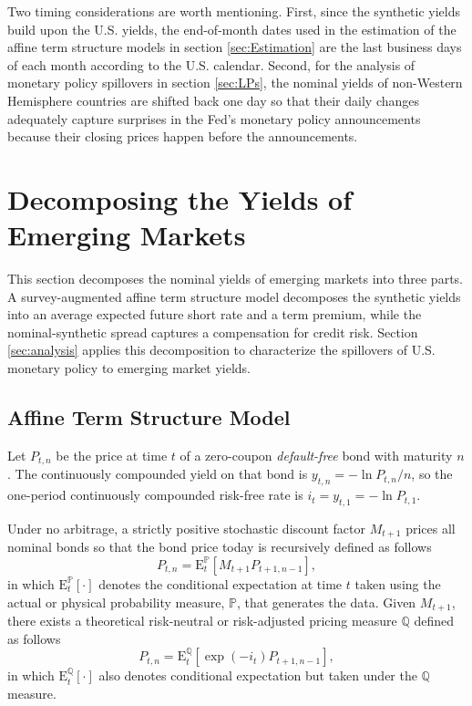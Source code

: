 \documentclass[a4paper, 12pt]{article}
\providecommand{\tnr}{n}
\providecommand{\idxt}{t}
\providecommand{\idxs}{\idxt,\tnr}
\providecommand{\yld}{y}
\providecommand{\yZero}{\yld_{\idxs}}
\providecommand{\Pzero}{P_{\idxs}}
\providecommand{\Pzerolag}{P_{\idxt+1,\tnr-1}}
\providecommand{\srate}{i}
\providecommand{\shortrate}{\srate_{\idxt}}
\providecommand{\SDF}{M_{\idxt+1}}
\providecommand{\Pmeasure}{\mathbb{P}}
\providecommand{\Qmeasure}{\mathbb{Q}}
\providecommand{\ExpP}{\mathrm{E}^{\Pmeasure}_{t}}
\providecommand{\ExpQ}{\mathrm{E}^{\Qmeasure}_{t}}
\newcommand{\PzeroP}{\Pzero = \ExpP \left[ \SDF \Pzerolag \right]}
\newcommand{\PzeroQ}{\Pzero = \ExpQ \left[ \exp\left(- \shortrate\right) \Pzerolag \right]}
\begin{document}
Two timing considerations are worth mentioning. First, since the synthetic yields build upon the U.S. yields, the end-of-month dates used in the estimation of the affine term structure models in section \ref{sec:Estimation} are the last business days of each month according to the U.S. calendar. Second, for the analysis of monetary policy spillovers in section \ref{sec:LPs}, the nominal yields of non-Western Hemisphere countries are shifted back one day so that their daily changes adequately capture surprises in the Fed's monetary policy announcements because their closing prices happen before the announcements. 


\section{Decomposing the Yields of Emerging Markets} \label{sec:Decomposition}
This section decomposes the nominal yields of emerging markets into three parts. A survey-augmented affine term structure model decomposes the synthetic yields into an average expected future short rate and a term premium, while the nominal-synthetic spread captures a compensation for credit risk. Section \ref{sec:analysis} applies this decomposition to characterize the spillovers of U.S. monetary policy to emerging market yields. 

\subsection{Affine Term Structure Model} \label{sec:YCmodel}
Let \(\Pzero\) be the price at time \(\idxt\) of a zero-coupon \textit{default-free} bond with maturity \(\tnr\). The continuously compounded yield on that bond is \(\yZero = - \ln \Pzero/\tnr\), so the one-period continuously compounded risk-free rate is \(\shortrate = \yld_{\idxt,1} = - \ln P_{t,1}\).

Under no arbitrage, a strictly positive stochastic discount factor \(\SDF\) prices all nominal bonds so that the bond price today is recursively defined as follows
\begin{equation} \label{eq:nPzeroP}
\PzeroP ,
\end{equation}
in which \(\ExpP [\cdot]\) denotes the conditional expectation at time \(\idxt\) taken using the actual or physical probability measure, \(\Pmeasure\), that generates the data. Given \(\SDF\), there exists a theoretical risk-neutral or risk-adjusted pricing measure \(\Qmeasure\) defined as follows 
\begin{equation} \label{eq:nPzeroQ}
\PzeroQ ,
\end{equation}
in which \(\ExpQ [\cdot]\) also denotes conditional expectation but taken under the \(\Qmeasure\)  measure. 
\end{document}
